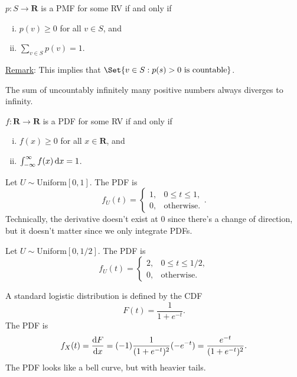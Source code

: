 \begin{Theorem}{}{}
    $ p\colon S\to\mathbf{R} $ is a PMF for some RV if and only if
    \begin{enumerate}[(i)]
        \item $ p(v)\ge 0 $ for all $ v\in S $, and
        \item $ \sum_{v\in S}p(v)=1 $.
    \end{enumerate}
    \underline{Remark}: This implies that $ \Set{v\in S\given p(s)>0\text{ is countable}} $.
\end{Theorem}
\begin{Exercise}{}{}
    The sum of uncountably infinitely many positive numbers always
    diverges to infinity.
\end{Exercise}
\begin{Theorem}{}{}
    $ f\colon \mathbf{R}\to\mathbf{R} $ is a PDF for some RV if and only if
    \begin{enumerate}[(i)]
        \item $ f(x)\ge 0 $ for all $ x\in\mathbf{R} $, and
        \item $ \int_{-\infty}^{\infty}f(x)\odif{x}=1 $.
    \end{enumerate}
\end{Theorem}
\begin{Example}{}{}
    Let $ U\sim \text{Uniform}[0,1] $. The PDF is
    \[ f_U(t)=\begin{cases}
            1, & 0\le t\le 1,      \\
            0, & \text{otherwise}.
        \end{cases}. \]
    Technically, the derivative doesn't exist at $0$ since there's a
    change of direction, but it doesn't matter since we only integrate
    PDFs.
\end{Example}
\begin{Example}{}{}
    Let $ U \sim \text{Uniform}[0,1/2] $. The PDF is
    \[ f_U(t)=\begin{cases}
            2, & 0\le t\le 1/2,    \\
            0, & \text{otherwise}.
        \end{cases} \]
\end{Example}
\begin{Definition}{}{}
    A standard logistic distribution is defined by the CDF
    \[ F(t)=\frac{1}{1+e^{-t}}. \]
    The PDF is
    \[ f_X(t)=\odv{F}{x}=(-1)\frac{1}{(1+e^{-t})^2}(-e^{-t})=\frac{e^{-t}}{(1+e^{-t})^2}. \]
    The PDF looks like a bell curve, but with heavier tails.
\end{Definition}
